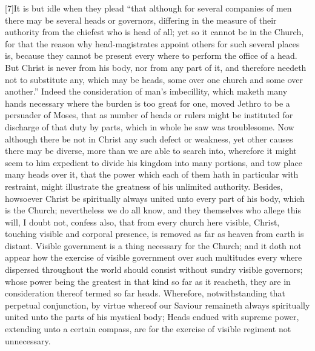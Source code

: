 [7]It is but idle when they plead “that although for several companies of men there may be several heads or governors, differing in the measure of their authority from the chiefest who is head of all; yet so it cannot be in the Church, for that the reason why head-magistrates appoint others for such several places is,
because they cannot be present every where to perform the office of a head. But Christ is never from his body, nor from any part of it, and therefore needeth not to substitute any, which may be heads, some over one church and some over another.” Indeed the consideration of man’s imbecillity, which maketh many hands necessary where the burden is too great for one, moved Jethro to be a persuader of Moses, that as number of heads or rulers might be instituted for discharge of that duty by parts, which in whole he saw was troublesome. Now although there be not in Christ any such defect or weakness, yet other causes there may be diverse, more than we are able to search into, wherefore it might seem to him expedient to divide his kingdom into many portions, and tow place many heads over it, that the power which each of them hath in particular with restraint, might illustrate the greatness of his unlimited authority. Besides, howsoever Christ be spiritually always united unto every part of his body, which is the Church; nevertheless we do all know, and they themselves who allege this will, I doubt not, confess also, that from every church here visible, Christ, touching visible and corporal presence, is removed as far as heaven from earth is distant. Visible government is a thing necessary for the Church; and it doth not appear how the exercise of visible government over such multitudes every where dispersed throughout the world should consist without sundry visible governors; whose power being the greatest in that kind so far as it reacheth, they are in consideration thereof termed so far heads. Wherefore, notwithstanding that perpetual conjunction, by virtue whereof our Saviour remaineth always spiritually united unto the parts of his mystical body; Heads endued with supreme power, extending unto a certain compass, are for the exercise of visible regiment not unnecessary.

